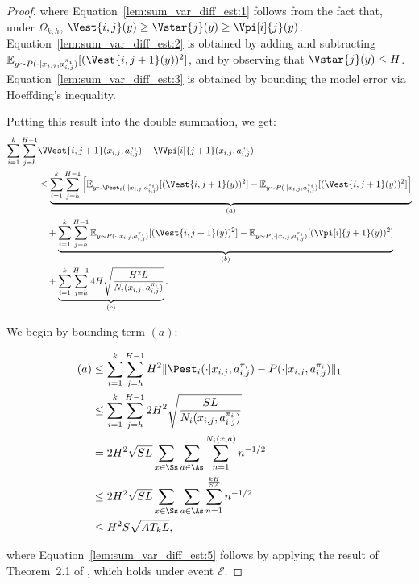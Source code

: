 \begin{proof}
where Equation~\eqref{lem:sum_var_diff_est:1} follows from the fact that, under $\Omega_{k,h}$, $\Vest{i,j}(y) \ge \Vstar{j}(y) \ge \Vpi[i]{j}(y)$. Equation~\eqref{lem:sum_var_diff_est:2} is obtained by adding and subtracting $\mathbb{E}_{y \sim P (\cdot | x_{i,j}, a_{i,j}^{\pi_i})} [(\Vest{i,j+1}(y))^2]$, and by observing that $\Vstar{j}(y) \le H$. Equation~\eqref{lem:sum_var_diff_est:3} is obtained by bounding the model error via Hoeffding's inequality.

Putting this result into the double summation, we get:
\begin{align}
\begin{split}
\label{lem:sum_var_diff_est:4}
    \sum_{i=1}^k \sum_{j=h}^{H-1} &\VVest{i,j+1}(x_{i,j}, a_{i,j}^{\pi_i}) - \VVpi[i]{j+1}(x_{i,j}, a_{i,j}^{\pi_i}) \\
    &\le \underbrace{\sum_{i=1}^k \sum_{j=h}^{H-1} \left[ \mathbb{E}_{y \sim \Pest_i (\cdot | x_{i,j}, a_{i,j}^{\pi_i})} [(\Vest{i,j+1}(y))^2] - \mathbb{E}_{y \sim P (\cdot | x_{i,j}, a_{i,j}^{\pi_i})} [(\Vest{i,j+1}(y))^2] \right]}_{(a)} \\
    &\quad + \underbrace{\sum_{i=1}^k \sum_{j=h}^{H-1} \mathbb{E}_{y \sim P (\cdot | x_{i,j}, a_{i,j}^{\pi_i})} [(\Vest{i,j+1}(y))^2] - \mathbb{E}_{y \sim P (\cdot | x_{i,j}, a_{i,j}^{\pi_i})} [(\Vpi[i]{j+1}(y))^2] }_{(b)} \\
    &\quad + \underbrace{\sum_{i=1}^k \sum_{j=h}^{H-1} 4 H \sqrt{\frac{H^2 L}{N_i (x_{i,j}, a_{i,j}^{\pi_i})}}  }_{(c)}.
\end{split}
\end{align}

We begin by bounding term $(a)$:

\begin{align}
    (a) &\le \sum_{i=1}^k \sum_{j=h}^{H-1} H^2 \| \Pest_i (\cdot | x_{i,j}, a_{i,j}^{\pi_i}) - P ( \cdot | x_{i,j}, a_{i,j}^{\pi_i}) \|_1 \nonumber \\
    &\le \sum_{i=1}^k \sum_{j=h}^{H-1} 2H^2 \sqrt{\frac{SL}{N_i (x_{i,j}, a_{i,j}^{\pi_i})}} \label{lem:sum_var_diff_est:5} \\
    &= 2 H^2 \sqrt{SL} \sum_{x\in\Ss} \sum_{a \in \As} \sum_{n=1}^{N_i(x,a)} n^{-1/2} \nonumber \\
    &\le 2 H^2 \sqrt{SL} \sum_{x\in\Ss} \sum_{a \in \As} \sum_{n=1}^{\frac{kH}{SA}} n^{-1/2} \nonumber \\
    &\le H^2 S \sqrt{A T_k L}, \nonumber
\end{align}

where Equation~\eqref{lem:sum_var_diff_est:5} follows by applying the result of Theorem~{2.1} of \cite{weissman2003}, which holds under event $\mathcal{E}$.


\end{proof}
